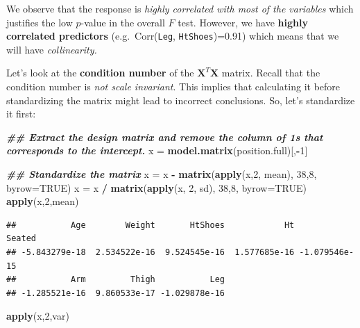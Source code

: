 \documentclass[
]{book}
\newenvironment{Shaded}{\begin{snugshade}}{\end{snugshade}}
\newcommand{\AttributeTok}[1]{\textcolor[rgb]{0.13,0.29,0.53}{#1}}
\newcommand{\ConstantTok}[1]{\textcolor[rgb]{0.56,0.35,0.01}{#1}}
\newcommand{\DecValTok}[1]{\textcolor[rgb]{0.00,0.00,0.81}{#1}}
\newcommand{\DocumentationTok}[1]{\textcolor[rgb]{0.56,0.35,0.01}{\textbf{\textit{#1}}}}
\newcommand{\FunctionTok}[1]{\textcolor[rgb]{0.13,0.29,0.53}{\textbf{#1}}}
\newcommand{\NormalTok}[1]{#1}
\newcommand{\OtherTok}[1]{\textcolor[rgb]{0.56,0.35,0.01}{#1}}
\newcommand{\SpecialCharTok}[1]{\textcolor[rgb]{0.81,0.36,0.00}{\textbf{#1}}}
\begin{document}
We observe that the response is \emph{highly correlated with most of the variables} which justifies the low \(p\)-value in the overall \(F\) test. However, we have \textbf{highly correlated predictors} (e.g.~Corr(\texttt{Leg}, \texttt{HtShoes})=0.91) which means that we will have \emph{collinearity.}

Let's look at the \textbf{condition number} of the \(\mathbf{X}^T\mathbf{X}\) matrix. Recall that the condition number is \emph{not scale invariant}. This implies that calculating it before standardizing the matrix might lead to incorrect conclusions. So, let's standardize it first:

\begin{Shaded}
\begin{Highlighting}[]
\DocumentationTok{\#\# Extract the design matrix and remove the column of 1s that corresponds to the intercept.}
\NormalTok{x }\OtherTok{=} \FunctionTok{model.matrix}\NormalTok{(position.full)[,}\SpecialCharTok{{-}}\DecValTok{1}\NormalTok{]}

\DocumentationTok{\#\# Standardize the matrix}
\NormalTok{x }\OtherTok{=}\NormalTok{ x }\SpecialCharTok{{-}} \FunctionTok{matrix}\NormalTok{(}\FunctionTok{apply}\NormalTok{(x,}\DecValTok{2}\NormalTok{, mean), }\DecValTok{38}\NormalTok{,}\DecValTok{8}\NormalTok{, }\AttributeTok{byrow=}\ConstantTok{TRUE}\NormalTok{)}
\NormalTok{x }\OtherTok{=}\NormalTok{ x }\SpecialCharTok{/} \FunctionTok{matrix}\NormalTok{(}\FunctionTok{apply}\NormalTok{(x, }\DecValTok{2}\NormalTok{, sd), }\DecValTok{38}\NormalTok{,}\DecValTok{8}\NormalTok{, }\AttributeTok{byrow=}\ConstantTok{TRUE}\NormalTok{)}
\FunctionTok{apply}\NormalTok{(x,}\DecValTok{2}\NormalTok{,mean)}
\end{Highlighting}
\end{Shaded}

\begin{verbatim}
##           Age        Weight       HtShoes            Ht        Seated 
## -5.843279e-18  2.534522e-16  9.524545e-16  1.577685e-16 -1.079546e-15 
##           Arm         Thigh           Leg 
## -1.285521e-16  9.860533e-17 -1.029878e-16
\end{verbatim}

\begin{Shaded}
\begin{Highlighting}[]
\FunctionTok{apply}\NormalTok{(x,}\DecValTok{2}\NormalTok{,var)}
\end{Highlighting}
\end{Shaded}
\end{document}
